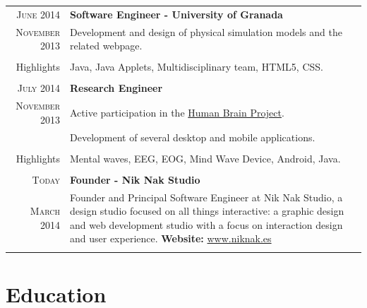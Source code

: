 \documentclass[a4paper,10pt]{article} %
\newcommand{\highlights}{\textcolor{skillscolor}{Highlights}}
\begin{document}
\begin{tabular}{r|p{11cm}}
\textsc{June 2014} & \textbf{Software Engineer - University of Granada} \\
\textsc{November 2013} 
& \footnotesize{Development and design of physical simulation models and the
related webpage.}\\
& \\
\highlights & Java, Java Applets, Multidisciplinary team, HTML5, CSS. \\
\multicolumn{2}{c}{} \\

\textsc{July 2014} & \textbf{Research Engineer} \\
\textsc{November 2013}
& \footnotesize{Active participation in the \href{https://www.humanbrainproject.eu/}{Human
Brain Project}.}\\
& \footnotesize{Development of several desktop and mobile
applications.} \\
& \\ 
\highlights & Mental waves, EEG, EOG,  Mind Wave Device, Android, Java. \\
\multicolumn{2}{c}{} \\

\textsc{Today} & \textbf{Founder - Nik Nak Studio} \\
\textsc{March 2014} 
& \footnotesize{Founder and Principal Software Engineer at Nik Nak Studio,  a
design studio focused on all things interactive: a graphic design and web 
development studio with a focus on interaction design and user experience.
\textbf{Website:}  \url{www.niknak.es}}\\
\multicolumn{2}{c}{} \\

\end{tabular}




\section{Education}
\end{document}
